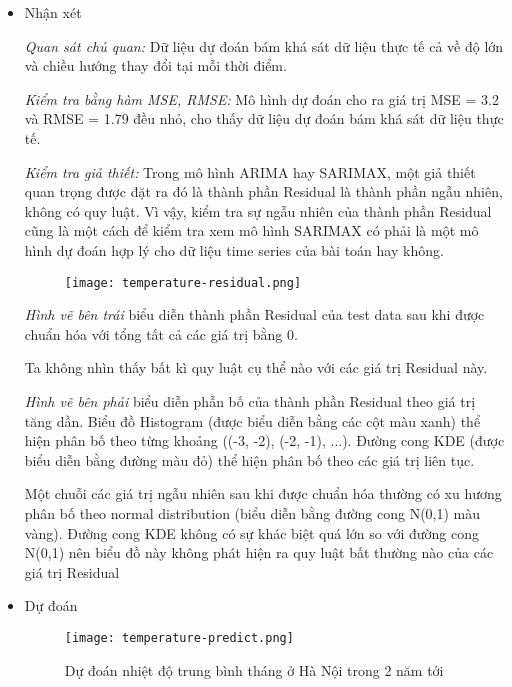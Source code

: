 \documentclass[12pt]{article}
\begin{document}
\begin{itemize}
        \item Nhận xét
        
            \textit{Quan sát chủ quan:} Dữ liệu dự đoán bám khá sát dữ liệu thực tế cả về độ lớn và chiều hướng thay đổi tại mỗi thời điểm.
            
            \textit{Kiểm tra bằng hàm MSE, RMSE:} Mô hình dự đoán cho ra giá trị MSE = 3.2 và RMSE = 1.79 đều nhỏ, cho thấy dữ liệu dự đoán bám khá sát dữ liệu thực tế.
            
            \textit{Kiểm tra giả thiết:} Trong mô hình ARIMA hay SARIMAX, một giả thiết quan trọng được đặt ra đó là thành phần Residual là thành phần ngẫu nhiên, không có quy luật. Vì vậy, kiểm tra sự ngẫu nhiên của thành phần Residual cũng là một cách để kiểm tra xem mô hình SARIMAX có phải là một mô hình dự đoán hợp lý cho dữ liệu time series của bài toán hay không.
            
            \begin{figure}[H]
                \centering
                \texttt{[image: temperature-residual.png]}
                \caption{}
            \end{figure}
            
            \textit{Hình vẽ bên trái} biểu diễn thành phần Residual của test data sau khi được chuẩn hóa với tổng tất cả các giá trị bằng 0.
            
            Ta không nhìn thấy bất kì quy luật cụ thể nào với các giá trị Residual này.
            
            \textit{Hình vẽ bên phải} biểu diễn phẫn bố của thành phần Residual theo giá trị tăng dần. Biểu đồ Histogram (được biểu diễn bằng các cột màu xanh) thể hiện phân bố theo từng khoảng ((-3, -2), (-2, -1), ...). Đường cong KDE (được biểu diễn bằng đường màu đỏ) thể hiện phân bố theo các giá trị liên tục.
            
            Một chuỗi các giá trị ngẫu nhiên sau khi được chuẩn hóa thường có xu hương phân bố theo normal distribution (biểu diễn bằng đường cong N(0,1) màu vàng). Đường cong KDE không có sự khác biệt quá lớn so với đường cong N(0,1) nên biểu đồ này không phát hiện ra quy luật bất thường nào của các giá trị Residual
            
            \item Dự đoán
            
            \begin{figure}[H]
                \centering
                \texttt{[image: temperature-predict.png]}
                \caption{Dự đoán nhiệt độ trung bình tháng ở Hà Nội trong 2 năm tới}
            \end{figure}
            
    \end{itemize}
    
\end{document}

